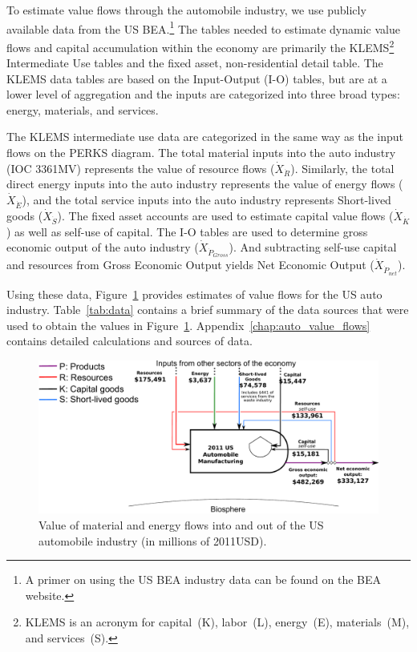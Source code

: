 To estimate value flows through the automobile industry, 
we use publicly available data from the 
US BEA.\footnote{A 
	primer on using the US BEA
	industry data can be found 
	on the BEA website.\cite{Streitwieser:2011aa}}
The  tables needed to estimate dynamic 
value flows and capital accumulation within the economy 
are primarily the KLEMS\footnote{KLEMS is an acronym for 
	capital~(K), labor~(L), energy~(E), materials~(M), and services~(S).} 
Intermediate Use
tables and 
the fixed asset, non-residential detail table. 
The KLEMS data tables
are based on the Input-Output (I-O) tables, 
but are at a lower level of aggregation and the inputs are categorized 
into three broad types: energy, materials, and services.

The KLEMS intermediate use data are categorized in the same
way as the input flows on the PERKS diagram. 
The total material inputs into the auto industry (IOC 3361MV) 
represents the value of resource flows ($\dot{X}_{\dot{R}}$). 
Similarly, the total direct energy inputs into the 
auto industry represents the value of energy flows ($\dot{X}_{\dot{E}}$),
and the total service inputs into the auto industry represents 
Short-lived goods ($\dot{X}_{\dot{S}}$).
The fixed asset accounts are
used to estimate capital value flows 
($\dot{X}_{\dot{K}}$) as well as self-use of capital.  
The I-O tables are used to determine gross economic output of the 
auto industry ($\dot{X}_{\dot{P}_{Gross}}$). And subtracting self-use capital and resources
from Gross Economic Output yields Net Economic Output ($\dot{X}_{\dot{P}_{net}}$).

Using these data, Figure~\ref{fig:PERKS_value_auto_ind} provides estimates 
of value flows for the US auto industry.
Table~\ref{tab:data} contains a brief summary  
of the data sources that were used 
to obtain the values in Figure~\ref{fig:PERKS_value_auto_ind}. 
Appendix~\ref{chap:auto_value_flows} contains
detailed calculations and sources of data.

\begin{landscape}
\begin{figure}[!ht]
\centering
\includegraphics[width=0.8\linewidth]{Part_2/Chapter_Values/images/PERKS_basic_unit_value_auto_ind.pdf}
\caption[Value of material and energy flows 
into and out of the US automobile industry]{Value 
of material and energy flows into and out of the 
US automobile industry (in millions of 2011USD).}
\label{fig:PERKS_value_auto_ind}
\end{figure}
\end{landscape}

